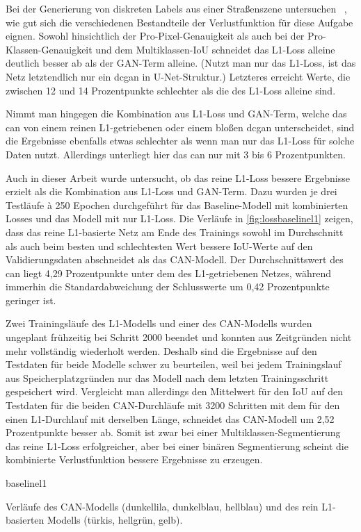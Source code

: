 Bei der Generierung von diskreten Labels aus einer Straßenszene untersuchen \citeauthor{Isola.2017}~\cite{Isola.2017}, wie gut sich die verschiedenen Bestandteile der Verlustfunktion für diese Aufgabe eignen.
Sowohl hinsichtlich der Pro-Pixel-Genauigkeit als auch bei der Pro-Klassen-Genauigkeit und dem Multiklassen-IoU schneidet das L1-Loss alleine deutlich besser ab als der GAN-Term alleine.
(Nutzt man nur das L1-Loss, ist das Netz letztendlich nur ein \gls{dcgan} in U-Net-Struktur.)
Letzteres erreicht Werte, die zwischen 12 und 14 Prozentpunkte schlechter als die des L1-Loss alleine sind.

Nimmt man hingegen die Kombination aus L1-Loss und GAN-Term, welche das \gls{can} von einem reinen L1-getriebenen oder einem bloßen \gls{dcgan} unterscheidet, sind die Ergebnisse ebenfalls etwas schlechter als wenn man nur das L1-Loss für solche Daten nutzt.
Allerdings unterliegt hier das \gls{can} nur mit 3 bis 6 Prozentpunkten.

Auch in dieser Arbeit wurde untersucht, ob das reine L1-Loss bessere Ergebnisse erzielt als die Kombination aus L1-Loss und GAN-Term.
Dazu wurden je drei Testläufe à 250 Epochen durchgeführt für das Baseline-Modell mit kombinierten Losses und das Modell mit nur L1-Loss.
Die Verläufe in \autoref{fig:lossbaselinel1} zeigen, dass das reine L1-basierte Netz am Ende des Trainings sowohl im Durchschnitt als auch beim besten und schlechtesten Wert bessere IoU-Werte auf den Validierungsdaten abschneidet als das CAN-Modell.
Der Durchschnittswert des \gls{can} liegt 4,29 Prozentpunkte unter dem des L1-getriebenen Netzes, während immerhin die Standardabweichung der Schlusswerte um 0,42 Prozentpunkte geringer ist.

Zwei Trainingsläufe des L1-Modells und einer des CAN-Modells wurden ungeplant frühzeitig bei Schritt 2000 beendet und konnten aus Zeitgründen nicht mehr vollständig wiederholt werden.
Deshalb sind die Ergebnisse auf den Testdaten für beide Modelle schwer zu beurteilen, weil bei jedem Trainingslauf aus Speicherplatzgründen nur das Modell nach dem letzten Trainingsschritt gespeichert wird.
Vergleicht man allerdings den Mittelwert für den IoU auf den Testdaten für die beiden CAN-Durchläufe mit 3200 Schritten mit dem für den einen L1-Durchlauf mit derselben Länge, schneidet das CAN-Modell um 2,52 Prozentpunkte besser ab.
Somit ist zwar bei einer Multiklassen-Segmentierung das reine L1-Loss erfolgreicher, aber bei einer binären Segmentierung scheint die kombinierte Verlustfunktion bessere Ergebnisse zu erzeugen.

\begin{losses}{baselinel1}
	\caption[Verläufe des CAN-Modells und des rein L1-basierten Modells]{Verläufe des CAN-Modells (dunkellila, dunkelblau, hellblau) und des rein L1-basierten Modells (türkis, hellgrün, gelb).}
	\label{fig:lossbaselinel1}
\end{losses}
